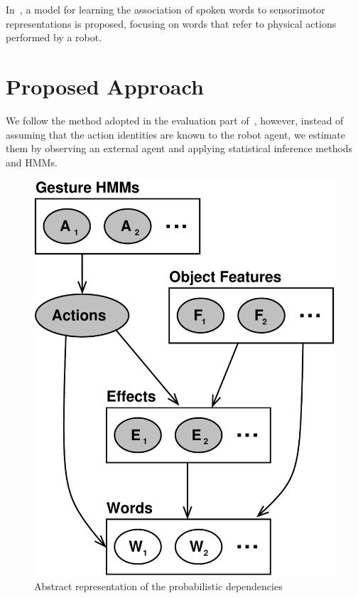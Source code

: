 \documentclass[a4paper]{article}
\begin{document}
In~\cite{stramandinoli:2016:icdl}, a model for learning the association of spoken words to sensorimotor representations is proposed, focusing on words that refer to physical actions performed by a robot.

\section{Proposed Approach}

We follow the method adopted in the evaluation part of~\cite{salvi:2012:smcb}, however, instead of assuming that the action identities are known to the robot agent, we estimate them by observing an external agent and applying statistical inference methods and \acp{HMM}.

\begin{figure}
  \includegraphics[width=\columnwidth]{fullNetAbstract}
  \caption{Abstract representation of the probabilistic dependencies}
\end{figure}
\end{document}
